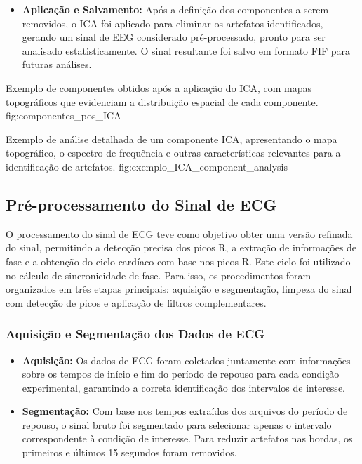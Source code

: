 \begin{itemize}
    \item \textbf{Aplicação e Salvamento:} Após a definição dos componentes a serem removidos, o ICA foi aplicado para eliminar os artefatos identificados, gerando um sinal de EEG considerado pré-processado, pronto para ser analisado estatisticamente. O sinal resultante foi salvo em formato FIF para futuras análises.
\end{itemize}


{Exemplo de componentes obtidos após a aplicação do ICA, com mapas topográficos que evidenciam a distribuição espacial de cada componente.}
{fig:componentes_pos_ICA}

{Exemplo de análise detalhada de um componente ICA, apresentando o mapa topográfico, o espectro de frequência e outras características relevantes para a identificação de artefatos.}
{fig:exemplo_ICA_component_analysis}


\subsection{Pré-processamento do Sinal de ECG}
\label{subsec:preprocess_ecg}

O processamento do sinal de ECG teve como objetivo obter uma versão refinada do sinal, permitindo a detecção precisa dos picos R, a extração de informações de fase e a obtenção do ciclo cardíaco com base nos picos R. Este ciclo foi utilizado no cálculo de sincronicidade de fase. Para isso, os procedimentos foram organizados em três etapas principais: aquisição e segmentação, limpeza do sinal com detecção de picos e aplicação de filtros complementares.

\subsubsection{Aquisição e Segmentação dos Dados de ECG}
\begin{itemize}
    \item \textbf{Aquisição:} Os dados de ECG foram coletados juntamente com informações sobre os tempos de início e fim do período de repouso para cada condição experimental, garantindo a correta identificação dos intervalos de interesse.
    \item \textbf{Segmentação:} Com base nos tempos extraídos dos arquivos do período de repouso, o sinal bruto foi segmentado para selecionar apenas o intervalo correspondente à condição de interesse. Para reduzir artefatos nas bordas, os primeiros e últimos 15 segundos foram removidos.
\end{itemize}

